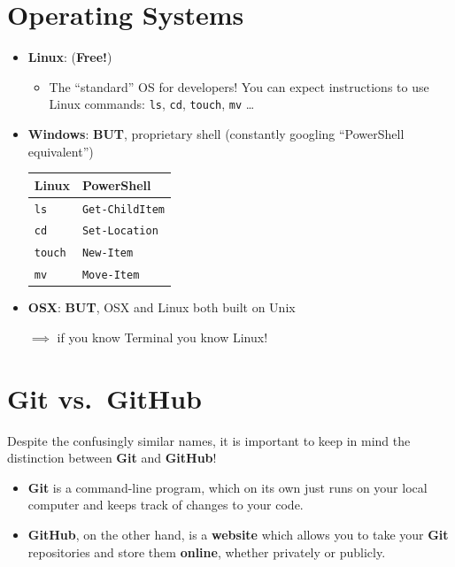 \documentclass[
  letterpaper,
  DIV=11,
  numbers=noendperiod,
  oneside]{scrreprt}
\providecommand{\tightlist}{%
  \setlength{\itemsep}{0pt}\setlength{\parskip}{0pt}}\usepackage{longtable,booktabs,array}
\begin{document}
\hypertarget{operating-systems}{%
\section{Operating Systems}\label{operating-systems}}

\begin{itemize}
\item
  \textbf{Linux}: (\textbf{Free!})

  \begin{itemize}
  \tightlist
  \item
    The ``standard'' OS for developers! You can expect instructions to
    use Linux commands: \texttt{ls}, \texttt{cd}, \texttt{touch},
    \texttt{mv} \ldots{}
  \end{itemize}
\item
  \textbf{Windows}: \textbf{BUT}, proprietary shell (constantly googling
  ``PowerShell equivalent'')

  \begin{longtable}[]{@{}ll@{}}
  \toprule\noalign{}
  Linux & PowerShell \\
  \midrule\noalign{}
  \endhead
  \bottomrule\noalign{}
  \endlastfoot
  \texttt{ls} & \texttt{Get-ChildItem} \\
  \texttt{cd} & \texttt{Set-Location} \\
  \texttt{touch} & \texttt{New-Item} \\
  \texttt{mv} & \texttt{Move-Item} \\
  \end{longtable}
\item
  \textbf{OSX}: \textbf{BUT}, OSX and Linux both built on Unix

  \(\implies\) if you know Terminal you know Linux!
\end{itemize}

\hypertarget{git-vs.-github}{%
\section{Git vs.~GitHub}\label{git-vs.-github}}

Despite the confusingly similar names, it is important to keep in mind
the distinction between \textbf{Git} and \textbf{GitHub}!

\begin{itemize}
\tightlist
\item
  \textbf{Git} is a command-line program, which on its own just runs on
  your local computer and keeps track of changes to your code.
\item
  \textbf{GitHub}, on the other hand, is a \textbf{website} which allows
  you to take your \textbf{Git} repositories and store them
  \textbf{online}, whether privately or publicly.
\end{itemize}
\end{document}
